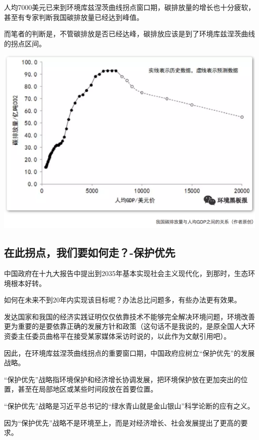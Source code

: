\documentclass[]{book}
\begin{document}
人均7000美元已来到环境库兹涅茨曲线拐点窗口期，碳排放量的增长也十分疲软，甚至有专家判断我国碳排放量已经达到峰值。

而笔者的判断是，不管碳排放是否已经达峰，碳排放应该是到了环境库兹涅茨曲线的拐点区间。

\includegraphics[width=8.33in]{images/huanjing2}

\hypertarget{ux5728ux6b64ux62d0ux70b9ux6211ux4eecux8981ux5982ux4f55ux8d70-ux4fddux62a4ux4f18ux5148}{%
\subsection{在此拐点，我们要如何走？-保护优先}\label{ux5728ux6b64ux62d0ux70b9ux6211ux4eecux8981ux5982ux4f55ux8d70-ux4fddux62a4ux4f18ux5148}}

中国政府在十九大报告中提出到2035年基本实现社会主义现代化，到那时，生态环境根本好转。

如何在未来不到20年内实现该目标呢？办法总比问题多，有些办法更有效果。

发达国家和我国的经济实践证明仅仅依靠技术不能够完全解决环境问题，环境改善更为重要的是要依靠正确的发展方针和政策（这句话不是我说的，是原全国人大环资委主任委员曲格平在接受某家媒体采访时说的，以此作为文献引用吧）。

因此，在环境库兹涅茨曲线拐点的重要窗口期，中国政府应树立``保护优先''的发展战略。

``保护优先''战略指环境保护和经济增长协调发展，把环境保护放在更加突出的位置，甚至在局部地区或某些时间段放在首要位置。

``保护优先''战略是习近平总书记的``绿水青山就是金山银山''科学论断的应有之义。

因为``保护优先''战略不是环境至上，而是对经济增长、社会发展提出了更高的要求。
\end{document}
